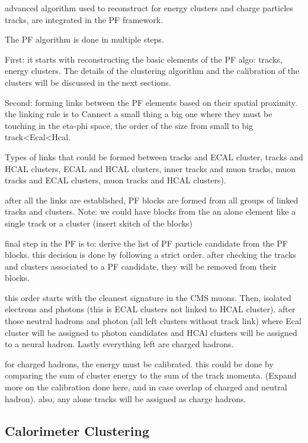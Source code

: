 advanced algorithm used to reconstruct for energy clusters and charge particles tracks, are integrated in the PF framework.

The PF algorithm is done in multiple steps.

First: it starts with reconstructing the basic elements of the PF algo: tracks, energy clusters. The details of the clustering algorithm and the calibration of the clusters will be discussed in the next sections. 

Second: forming links between the PF elements based on their spatial proximity. the linking rule is to Cannect a small thing a big one where they must be touching in the eta-phi space, the order of the size from small to big track<Ecal<Hcal.

Types of links that could be formed between tracks and ECAL cluster, tracks and HCAL clusters, ECAL and HCAL clusters, inner tracks and muon tracks, muon tracks and ECAL clusters, muon tracks and HCAL clusters).  

after all the links are established, PF blocks are formed from all groups of linked tracks and clusters. Note: we could have blocks from the an alone element like a single track or a cluster (insert skitch of the blocks)

final step in the PF is to:  derive the list of PF particle candidate from the PF blocks. this decision is done by following a strict order. after checking the tracks and clusters associated to a PF candidate, they will be removed from their blocks.  

this order starts with the cleanest signature in the CMS muons. Then, isolated electrons and photons (this is ECAL clusters not linked to HCAL cluster). after those neutral hadrons and photon (all left clusters without track link) where Ecal cluster will be assigned to photon candidates and HCAl clusters will be assigned to a neural hadron. Lastly everything left are charged hadrons.

for charged hadrons, the energy must be calibrated. this could be done by comparing the sum of cluster energy to the sum of the track momenta. (Expand more on the calibration done here, and in case overlap of charged and neutral hadron). also, any alone tracks will be assigned as charge hadrons.

\subsection{Calorimeter Clustering}


